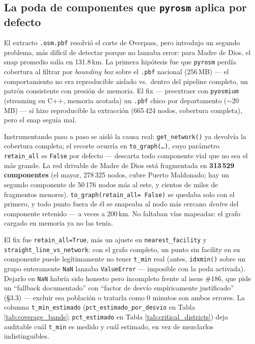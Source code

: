 \documentclass[11pt]{article}
\begin{document}
\subsection{La poda de componentes que \texttt{pyrosm} aplica por defecto}

El extracto \texttt{.osm.pbf} resolvió el corte de Overpass, pero introdujo
un segundo problema, más difícil de detectar porque no lanzaba error: para
Madre de Dios, el snap promedio salía en 131.8\,km. La primera hipótesis
fue que \texttt{pyrosm} perdía cobertura al filtrar por \emph{bounding box}
sobre el \texttt{.pbf} nacional (256\,MB) --- el comportamiento no era
reproducible aislado vs.\ dentro del pipeline completo, un patrón
consistente con presión de memoria. El fix --- preextraer con
\texttt{pyosmium} (streaming en C++, memoria acotada) un \texttt{.pbf}
chico por departamento (${\sim}$20\,MB) --- sí hizo reproducible la
extracción (665\,424 nodos, cobertura completa), pero el snap seguía mal.

Instrumentando paso a paso se aisló la causa real: \texttt{get\_network()}
ya devolvía la cobertura completa; el recorte ocurría en
\texttt{to\_graph(\ldots)}, cuyo parámetro \texttt{retain\_all} es
\texttt{False} por defecto --- descarta todo componente vial que no sea el
más grande. La red drivable de Madre de Dios está fragmentada en
\textbf{313\,529 componentes} (el mayor, 278\,325 nodos, cubre Puerto
Maldonado; hay un segundo componente de 50\,176 nodos más al este, y
cientos de miles de fragmentos menores). \texttt{to\_graph(retain\_all=
False)} se quedaba solo con el primero, y todo punto fuera de él se
snapeaba al nodo más cercano \emph{dentro} del componente retenido ---
a veces a 200\,km. No faltaban vías mapeadas: el grafo cargado en memoria
ya no las tenía.

El fix fue \texttt{retain\_all=True}, más un ajuste en
\texttt{nearest\_facility} y \texttt{straight\_line\_vs\_network}: con el
grafo completo, un punto sin facility en su componente puede legítimamente
no tener \texttt{t\_min} real (antes, \texttt{idxmin()} sobre un grupo
enteramente \texttt{NaN} lanzaba \texttt{ValueError} --- imposible con la
poda activada). Dejarlo en \texttt{NaN} habría sido honesto pero
incompleto frente al issue \#186, que pide un ``fallback documentado'' con
``factor de desvío empíricamente justificado'' (\S3.3) --- excluir esa
población o tratarla como 0 minutos son ambos errores. La columna
\texttt{t\_min\_estimado} (\texttt{pct\_estimado\_por\_desvio} en Tabla
\ref{tab:coverage_bands}; \texttt{pct\_estimado} en Tabla
\ref{tab:critical_districts}) deja auditable cuál \texttt{t\_min} es
medido y cuál estimado, en vez de mezclarlos indistinguibles.
\end{document}
